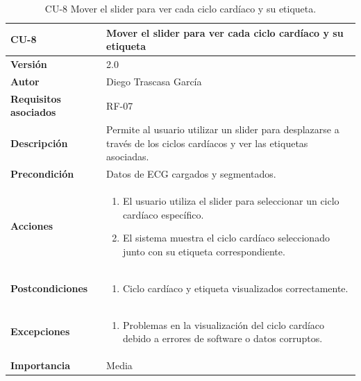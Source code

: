 \begin{table}[p]
	\centering
	\begin{tabularx}{\linewidth}{ p{} p{} }
		\toprule
		\textbf{CU-8}    & \textbf{Mover el slider para ver cada ciclo cardíaco y su etiqueta}\\
		\toprule
		\textbf{Versión}              & 2.0    \\
		\textbf{Autor}                & Diego Trascasa García \\
		\textbf{Requisitos asociados} & RF-07 \\
		\textbf{Descripción}          & Permite al usuario utilizar un slider para desplazarse a través de los ciclos cardíacos y ver las etiquetas asociadas. \\
		\textbf{Precondición}         & Datos de ECG cargados y segmentados. \\
		\textbf{Acciones}             &
		\begin{enumerate}
			\item El usuario utiliza el slider para seleccionar un ciclo cardíaco específico.
			\item El sistema muestra el ciclo cardíaco seleccionado junto con su etiqueta correspondiente.
		\end{enumerate}\\
		\textbf{Postcondiciones}      & 
		\begin{enumerate}
			\item Ciclo cardíaco y etiqueta visualizados correctamente.
		\end{enumerate}\\
		\textbf{Excepciones}          & 
		\begin{enumerate}
			\item Problemas en la visualización del ciclo cardíaco debido a errores de software o datos corruptos.
		\end{enumerate}\\
		\textbf{Importancia}          & Media \\
		\bottomrule
	\end{tabularx}
	\caption{CU-8 Mover el slider para ver cada ciclo cardíaco y su etiqueta.}
    \label{CU-8}
\end{table}


